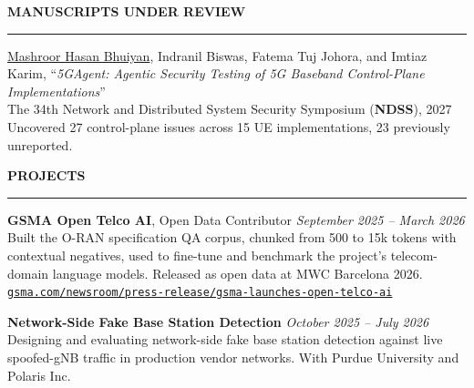 \documentclass[11pt,letterpaper]{article}
\makeatletter
\def\sectionlineskip{\medskip}%
\def\sectionskip{\medskip}    %
\newcommand{\dates}[1]{\textit{#1}}
\newenvironment{rSection}[1]{%
  \sectionskip
  \MakeUppercase{\bf #1} %
  \par\nobreak            %
  \sectionlineskip
  \nobreak
  \hrule %
  \nobreak
  \@beginparpenalty\@M    %
  \begin{list}{}{%
    \setlength{\leftmargin}{1.5em} %
  }
  \item[]
}{%
  \end{list}
}
\makeatother
\begin{document}

\begin{rSection}{Manuscripts Under Review}
\itemsep -3pt

{\underline{Mashroor Hasan Bhuiyan}, Indranil Biswas, Fatema Tuj Johora, and Imtiaz Karim, ``\textit{5GAgent: Agentic Security Testing of 5G Baseband Control-Plane Implementations}'' \\
The 34th Network and Distributed System Security Symposium (\textbf{NDSS}), 2027 \\
Uncovered 27 control-plane issues across 15 UE implementations, 23 previously unreported.}

\end{rSection}


\begin{rSection}{Projects}
\itemsep -3pt

{\textbf{GSMA Open Telco AI}, Open Data Contributor \hfill \dates{September 2025 -- March 2026} \\
Built the O-RAN specification QA corpus, chunked from 500 to 15k tokens with contextual negatives, used to fine-tune and benchmark the project's telecom-domain language models. Released as open data at MWC Barcelona 2026. \\
\href{https://www.gsma.com/newsroom/press-release/gsma-launches-open-telco-ai-to-accelerate-development-of-telco\%E2\%80\%91grade-ai/}{\texttt{gsma.com/newsroom/press-release/gsma-launches-open-telco-ai}}}

{\textbf{Network-Side Fake Base Station Detection} \hfill \dates{October 2025 -- July 2026} \\
Designing and evaluating network-side fake base station detection against live spoofed-gNB traffic in production vendor networks. With Purdue University and Polaris Inc.}

\end{rSection}

\end{document}
